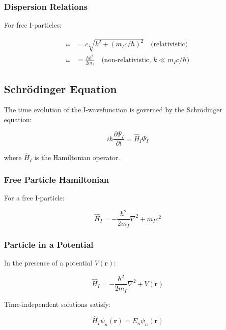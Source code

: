 \subsubsection{Dispersion Relations}

For free I-particles:

\begin{align}
\label{eq:dispersion_relativistic}
\omega &= c\sqrt{k^2 + (m_I c/\hbar)^2} \quad \text{(relativistic)} \\
\label{eq:dispersion_nonrelativistic}
\omega &= \frac{\hbar k^2}{2m_I} \quad \text{(non-relativistic, } k \ll m_I c/\hbar\text{)}
\end{align}

\subsection{Schrödinger Equation}

The time evolution of the I-wavefunction is governed by the Schrödinger equation:

\begin{equation}
\label{eq:schrodinger}
i\hbar\frac{\partial\Psi_I}{\partial t} = \hat{H}_I \Psi_I
\end{equation}

where $\hat{H}_I$ is the Hamiltonian operator.

\subsubsection{Free Particle Hamiltonian}

For a free I-particle:

\begin{equation}
\label{eq:free_hamiltonian}
\hat{H}_I = -\frac{\hbar^2}{2m_I}\nabla^2 + m_I c^2
\end{equation}

\subsubsection{Particle in a Potential}

In the presence of a potential $V(\mathbf{r})$:

\begin{equation}
\label{eq:hamiltonian_potential}
\hat{H}_I = -\frac{\hbar^2}{2m_I}\nabla^2 + V(\mathbf{r})
\end{equation}

Time-independent solutions satisfy:

\begin{equation}
\label{eq:time_independent_schrodinger}
\hat{H}_I \psi_n(\mathbf{r}) = E_n \psi_n(\mathbf{r})
\end{equation}

